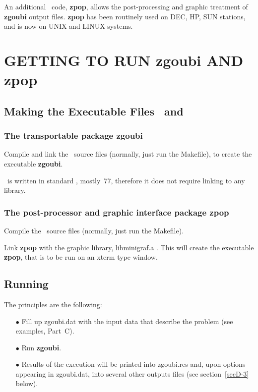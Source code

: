 \bigskip

\noindent An additional \FORTRAN\ code, \textbf{zpop},
allows the post-processing and graphic treatment of \textbf{zgoubi} output 
files. \textbf{zpop} has been routinely used on DEC, HP, SUN stations, and is now on UNIX and LINUX systems.
\bigskip

\section{GETTING TO RUN zgoubi AND zpop} %

\subsection{Making the Executable Files \zgoubi\ and \zpop}

\subsubsection{The transportable package zgoubi}

Compile and link the \FORTRAN\ source files  (normally, just run the Makefile), to create the 
executable \textbf{zgoubi}.
\bigskip

\noindent \zgoubi\ is  written in standard 
\FORTRAN, mostly~77, therefore it does not require linking  to any library. 


\subsubsection{The post-processor and graphic interface package zpop} 

Compile  the  \FORTRAN\ source files  (normally, just run the Makefile). 
\bigskip


\noindent Link \textbf{zpop} with the graphic library, libminigraf.a 
\cite{HAMEL}. This will create the executable \textbf{zpop}, that is to be run on an 
xterm type window. 
\bigskip

 \subsection{Running \zgoubi} 

The principles are the following:
\begin{itemize}
\item[$\bullet$] Fill up zgoubi.dat    with the input data that describe the 
problem (see examples, Part~C). 
\item[$\bullet$] Run  \textbf{zgoubi}. 
\item[$\bullet$] Results of the execution will be printed into  
zgoubi.res  and, upon options appearing in zgoubi.dat,
 into several other outputs files (see section~\ref{secD-3} below).  
\end{itemize}

